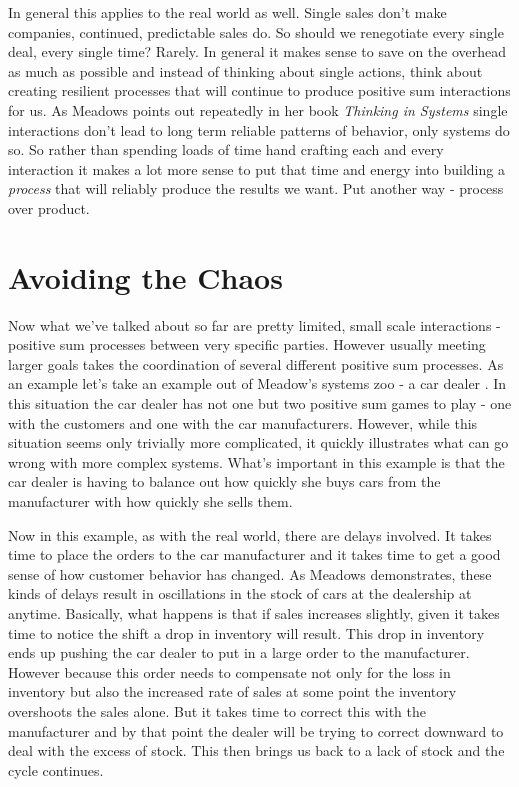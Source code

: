 \documentclass[11pt,a5paper]{book}
\begin{document}
In general this applies to the real world as well. Single sales don't make companies, continued, predictable sales do. So should we renegotiate every single deal, every single time? Rarely. In general it makes sense to save on the overhead as much as possible and instead of thinking about single actions, think about creating resilient processes that will continue to produce positive sum interactions for us. As Meadows points out repeatedly in her book \textit{Thinking in Systems} \cite{meadows} single interactions don't lead to long term reliable patterns of behavior, only systems do so. So rather than spending loads of time hand crafting each and every interaction it makes a lot more sense to put that time and energy into building a \textit{process} that will reliably produce the results we want. Put another way - process over product.

\section{Avoiding the Chaos}
Now what we've talked about so far are pretty limited, small scale interactions - positive sum processes between very specific parties. However usually meeting larger goals takes the coordination of several different positive sum processes. As an example let's take an example out of Meadow's systems zoo - a car dealer \cite{meadows}. In this situation the car dealer has not one but two positive sum games to play - one with the customers and one with the car manufacturers. However, while this situation seems only trivially more complicated, it quickly illustrates what can go wrong with more complex systems. What's important in this example is that the car dealer is having to balance out how quickly she buys cars from the manufacturer with how quickly she sells them.
\newline

Now in this example, as with the real world, there are delays involved. It takes time to place the orders to the car manufacturer and it takes time to get a good sense of how customer behavior has changed. As Meadows demonstrates, these kinds of delays result in oscillations in the stock of cars at the dealership at anytime. Basically, what happens is that if sales increases slightly, given it takes time to notice the shift a drop in inventory will result. This drop in inventory ends up pushing the car dealer to put in a large order to the manufacturer. However because this order needs to compensate not only for the loss in inventory but also the increased rate of sales at some point the inventory overshoots the sales alone. But it takes time to correct this with the manufacturer and by that point the dealer will be trying to correct downward to deal with the excess of stock. This then brings us back to a lack of stock and the cycle continues.
\newline
\end{document}
